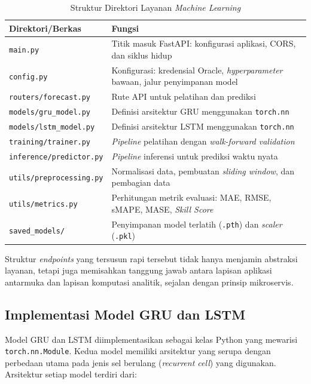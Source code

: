 \begin{table}[htbp]
\centering
\caption{Struktur Direktori Layanan \textit{Machine Learning}}
\label{tab:struktur-ml}
\begin{tabular}{|p{5.5cm}|p{8.5cm}|}
\hline
\textbf{Direktori/Berkas} & \textbf{Fungsi} \\
\hline
\texttt{main.py} & Titik masuk FastAPI: konfigurasi aplikasi, CORS, dan siklus hidup \\
\hline
\texttt{config.py} & Konfigurasi: kredensial Oracle, \textit{hyperparameter} bawaan, jalur penyimpanan model \\
\hline
\texttt{routers/forecast.py} & Rute API untuk pelatihan dan prediksi \\
\hline
\texttt{models/gru\_model.py} & Definisi arsitektur GRU menggunakan \texttt{torch.nn} \\
\hline
\texttt{models/lstm\_model.py} & Definisi arsitektur LSTM menggunakan \texttt{torch.nn} \\
\hline
\texttt{training/trainer.py} & \textit{Pipeline} pelatihan dengan \textit{walk-forward validation} \\
\hline
\texttt{inference/predictor.py} & \textit{Pipeline} inferensi untuk prediksi waktu nyata \\
\hline
\texttt{utils/preprocessing.py} & Normalisasi data, pembuatan \textit{sliding window}, dan pembagian data \\
\hline
\texttt{utils/metrics.py} & Perhitungan metrik evaluasi: MAE, RMSE, sMAPE, MASE, \textit{Skill Score} \\
\hline
\texttt{saved\_models/} & Penyimpanan model terlatih (\texttt{.pth}) dan \textit{scaler} (\texttt{.pkl}) \\
\hline
\end{tabular}
\end{table}

Struktur \textit{endpoints} yang tersusun rapi tersebut tidak hanya menjamin abstraksi layanan, tetapi juga memisahkan tanggung jawab antara lapisan aplikasi antarmuka dan lapisan komputasi analitik, sejalan dengan prinsip mikroservis.

\subsection{Implementasi Model GRU dan LSTM}

Model GRU dan LSTM diimplementasikan sebagai kelas Python yang mewarisi \texttt{torch.nn.Module}. Kedua model memiliki arsitektur yang serupa dengan perbedaan utama pada jenis sel berulang (\textit{recurrent cell}) yang digunakan. Arsitektur setiap model terdiri dari:

